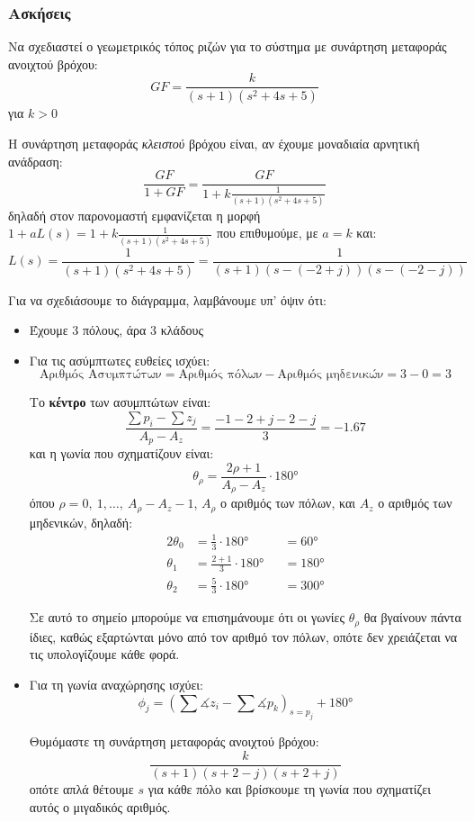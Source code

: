 \documentclass[11pt,a4paper,notitlepage,fleqn,final]{article}
\begin{document}
\subsubsection{Ασκήσεις}
\begin{exercise}
	Να σχεδιαστεί ο γεωμετρικός τόπος ριζών για το σύστημα με συνάρτηση μεταφοράς ανοιχτού βρόχου:
	\[
	GF = \frac{k}{(s+1)(s^2+4s+5)}
	\]
	για \( k>0 \)
	
	\tcblower
	
	Η συνάρτηση μεταφοράς \textit{κλειστού} βρόχου είναι, αν έχουμε μοναδιαία αρνητική
	ανάδραση:
	\[
	\frac{GF}{1+GF} = \frac{GF}{1+k\frac{1}{(s+1)(s^2+4s+5)}}
	\]
	δηλαδή στον παρονομαστή εμφανίζεται η μορφή \( 1+aL(s) = 1+k\frac{1}{(s+1)(s^2+4s+5)} \) που επιθυμούμε, με \( a=k \) και:
	\[
	L(s) = \frac{1}{(s+1)(s^2+4s+5)} = \frac{1}{(s+1)\left( s-(-2+j) \right)\left(s-(-2-j)\right)}
	\]
	
	Για να σχεδιάσουμε το διάγραμμα, λαμβάνουμε υπ' όψιν ότι:
	\begin{itemize}
		\item Έχουμε 3 πόλους, άρα 3 κλάδους
		\item Για τις ασύμπτωτες ευθείες ισχύει:
		\[
		\text{Αριθμός Ασυμπτώτων} = \text{Αριθμός πόλων} - \text{Αριθμός μηδενικών} = 3-0 = 3
		\]
		
		Το \textbf{κέντρο} των ασυμπτώτων είναι:
		\[
		\frac{\sum p_i - \sum z_j}{A_p - A_z} = \frac{-1-2+j-2-j}{3} = -1.67
		\]
		και η γωνία που σχηματίζουν είναι:
		\[
		\theta_ρ = \frac{2ρ+1}{A_ρ-Α_z} \cdot \ang{180}
		\]
		όπου \( ρ = 0,\ 1,\dots,\ A_ρ-A_z-1 \), \( A_ρ \) ο αριθμός των πόλων, και \( A_z \) ο
		αριθμός των μηδενικών, δηλαδή:
		\begin{alignat*}{2}
		\theta_0 &= \frac{1}{3}\cdot\ang{180} &&= \ang{60} \\
		\theta_1 &= \frac{2+1}{3}\cdot\ang{180} &&= \ang{180} \\
		\theta_2 &= \frac{5}{3}\cdot\ang{180} &&= \ang{300}
		\end{alignat*}
		
		Σε αυτό το σημείο μπορούμε να επισημάνουμε ότι οι γωνίες \( \theta_ρ \) θα βγαίνουν
		πάντα ίδιες, καθώς εξαρτώνται μόνο από τον αριθμό τον πόλων, οπότε δεν
		χρειάζεται να τις υπολογίζουμε κάθε φορά.
		\item Για τη γωνία αναχώρησης ισχύει:
		\[
		\phi_j = \left( \sum \measuredangle z_i - \sum \measuredangle p_k \right)_{s=p_j}
		+\ang{180}
		\]
		
		Θυμόμαστε τη συνάρτηση μεταφοράς ανοιχτού βρόχου:
		\[
		\frac{k}{(s+1)(s+2-j)(s+2+j)}
		\]
		οπότε απλά θέτουμε \( s \) για κάθε πόλο και βρίσκουμε τη γωνία που σχηματίζει αυτός
		ο μιγαδικός αριθμός.
		

\end{itemize}
\end{exercise}
\end{document}
